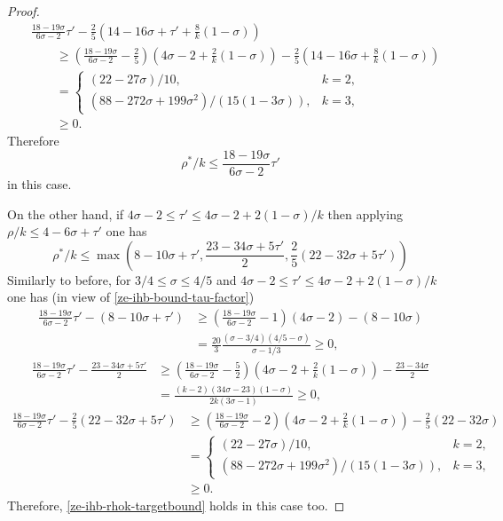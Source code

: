 \begin{proof}
\begin{align*}
&\frac{18 - 19\sigma}{6\sigma - 2}\tau' - \frac{2}{5}(14 - 16\sigma + \tau' + \frac{8}{k}(1 - \sigma)) \\
&\qquad\ge \left(\frac{18 - 19\sigma}{6\sigma - 2} - \frac{2}{5}\right)(4\sigma - 2 + \frac{2}{k}(1 - \sigma)) - \frac{2}{5}(14 - 16\sigma + \frac{8}{k}(1 - \sigma))\\
&\qquad= \begin{cases}
(22 - 27\sigma)/10,&k = 2,\\
(88 - 272\sigma + 199\sigma^2)/(15(1 - 3\sigma)),&k=3,
\end{cases}\\
&\qquad\ge 0. 
\end{align*}
Therefore 
\begin{equation}\label{ze-ihb-rhok-targetbound}
\rho^*/k \le \frac{18 - 19\sigma}{6\sigma - 2}\tau'
\end{equation}
in this case. 

On the other hand, if $4\sigma - 2 \le \tau' \le 4\sigma - 2 + 2(1 - \sigma)/k$ then applying $\rho/k \le 4 - 6\sigma + \tau'$ one has 
\[ 
\rho^*/k \le \max(8 -10\sigma + \tau',\frac{23 - 34\sigma + 5\tau'}{2}, \frac{2}{5}(22 - 32\sigma +  5\tau'))
\]
Similarly to before, for $3/4 \le \sigma \le 4/5$ and $4\sigma - 2 \le \tau' \le 4\sigma - 2 + 2(1 - \sigma)/k$ one has (in view of \eqref{ze-ihb-bound-tau-factor})
\begin{align*}
\frac{18 - 19\sigma}{6\sigma - 2}\tau' - (8 - 10\sigma + \tau') &\ge \left(\frac{18 - 19\sigma}{6\sigma - 2} - 1\right)(4\sigma - 2) - (8 - 10\sigma) \\
&= \frac{20}{3}\frac{(\sigma - 3/4) (4/5 - \sigma)}{\sigma - 1/3} \ge 0,
\end{align*}
\begin{align*}
\frac{18 - 19\sigma}{6\sigma - 2}\tau' - \frac{23 - 34\sigma + 5\tau'}{2} &\ge \left(\frac{18 - 19\sigma}{6\sigma - 2} - \frac{5}{2}\right)(4\sigma - 2 + \frac{2}{k}(1 - \sigma)) - \frac{23 - 34\sigma}{2}\\
&= \frac{(k - 2)(34\sigma - 23)(1 - \sigma)}{2k(3\sigma - 1)} \ge 0,
\end{align*}
\begin{align*}
\frac{18 - 19\sigma}{6\sigma - 2}\tau' - \frac{2}{5}(22 - 32\sigma +  5\tau') &\ge \left(\frac{18 - 19\sigma}{6\sigma - 2} - 2\right)(4\sigma - 2 + \frac{2}{k}(1 - \sigma)) - \frac{2}{5}(22 - 32\sigma)\\
&= \begin{cases}
(22 - 27\sigma)/10,&k = 2,\\
(88 - 272\sigma + 199\sigma^2)/(15(1 - 3\sigma)),&k=3,
\end{cases}\\
&\ge 0. 
\end{align*}
Therefore, \eqref{ze-ihb-rhok-targetbound} holds in this case too.


\end{proof}
